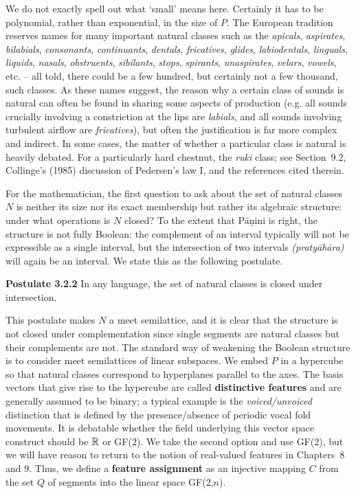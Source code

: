\smallskip\noindent We do not exactly spell out what `small' means
here. Certainly it has to be polynomial, rather than exponential, in the size
of $P$. The European tradition reserves names for many important natural
classes such as the {\it apicals}, {\it aspirates}, {\it bilabials}, {\it
  consonants}, {\it continuants}, {\it dentals}, {\it fricatives}, {\it
  glides}, {\it labiodentals}, {\it linguals}, {\it liquids}, {\it nasals},
{\it obstruents}, {\it sibilants}, {\it stops}, {\it spirants}, {\it
  unaspirates}, {\it velars}, {\it vowels}, etc. -- all told, there could be a
few hundred, but certainly not a few thousand, such classes.  As these names
suggest, the reason why a certain class of sounds is natural can often be
found in sharing some aspects of production (e.g. all sounds crucially
involving a constriction at the lips are {\it labials}, and all sounds
involving turbulent airflow are {\it fricatives}), but often the justification
is far more complex and indirect. In some cases, the matter of whether a
particular class is natural is heavily debated. For a particularly hard
chestnut, the {\it ruki} class; see Section~9.2, Collinge's (1985)
discussion of Pedersen's law I, and the references cited therein. 
 \nocite{Collinge:1985}

For the mathematician, the first question to ask about the set of natural
classes $N$ is neither its size nor its exact membership but rather its
algebraic structure: under what operations is $N$ closed? To the extent that
P\={a}\d{n}ini is right, the structure is not fully Boolean: the complement of
an interval typically will not be expressible as a single interval, but the
intersection of two intervals {\it (praty\={a}h\={a}ra)} will again be an
interval. We state this as the following postulate.

\smallskip\noindent
{\bf Postulate 3.2.2} In any language, the set of natural classes is closed 
under intersection. 

\smallskip\noindent This postulate makes $N$ a meet semilattice, and it is
clear that the structure is not closed under complementation since single
segments are natural classes but their complements are not. The standard way
of weakening the Boolean structure is to consider meet semilattices of linear
subspaces. We embed $P$ in a hypercube so that natural classes correspond to
hyperplanes parallel to the axes. The basis vectors that give rise to the
hypercube are called {\bf distinctive features} and are generally assumed to
be binary; a typical example is the {\it voiced/unvoiced} distinction that is
defined by the presence/absence of periodic vocal fold
movements.   
It is debatable whether the field underlying this vector space construct
should be $\Bbb R$ or GF(2). We take the second option and use GF(2), but we
will have reason to return to the notion of real-valued features in
Chapters~8 and 9. Thus, we define a {\bf feature assignment} as an injective
mapping $C$ from the set $Q$ of segments into the linear space
GF(2,$n$).

